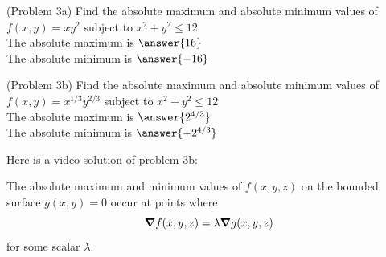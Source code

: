 \documentclass[handout]{ximera}
\begin{document}
\begin{problem}(Problem 3a)
Find the absolute maximum and absolute minimum values of $f(x,y) = xy^2$ subject to $x^2 + y^2 \leq 12$\\
The absolute maximum is $\answer{16}$\\
The absolute minimum is $\answer{-16}$
\end{problem}

\begin{problem}(Problem 3b)
Find the absolute maximum and absolute minimum values of $f(x,y) = x^{1/3}y^{2/3}$ subject to $x^2 + y^2 \leq 12$\\
The absolute maximum is $\answer{2^{4/3}}$\\
The absolute minimum is $\answer{-2^{4/3}}$
\end{problem}

Here is a video solution of problem 3b:\\
\begin{foldable}
\end{foldable}


\begin{theorem}
The absolute maximum and minimum values of $f(x,y, z)$ on the bounded surface $g(x,y) = 0$ occur at 
points where 
\[
\boldsymbol\nabla f(x,y, z) = \lambda \boldsymbol\nabla g(x,y, z)
\]
for some scalar $\lambda$.
\end{theorem}
\end{document}
